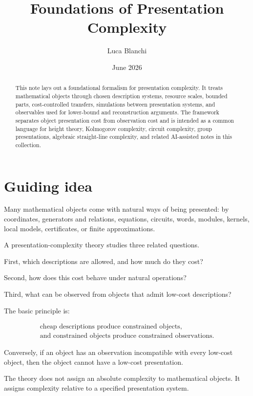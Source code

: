 \documentclass[11pt]{article}
\title{Foundations of Presentation Complexity}
\author{Luca Blanchi}
\date{June 2026}
\begin{document}
\maketitle

\begin{abstract}
This note lays out a foundational formalism for presentation complexity. It treats mathematical objects through chosen description systems, resource scales, bounded parts, cost-controlled transfers, simulations between presentation systems, and observables used for lower-bound and reconstruction arguments. The framework separates object presentation cost from observation cost and is intended as a common language for height theory, Kolmogorov complexity, circuit complexity, group presentations, algebraic straight-line complexity, and related AI-assisted notes in this collection.
\end{abstract}

\section{Guiding idea}

Many mathematical objects come with natural ways of being presented: by coordinates, generators and relations, equations, circuits, words, modules, kernels, local models, certificates, or finite approximations.

A presentation-complexity theory studies three related questions.

First, which descriptions are allowed, and how much do they cost?

Second, how does this cost behave under natural operations?

Third, what can be observed from objects that admit low-cost descriptions?

The basic principle is:

\[
\begin{gathered}
\text{cheap descriptions produce constrained objects,}\\
\text{and constrained objects produce constrained observations.}
\end{gathered}
\]

Conversely, if an object has an observation incompatible with every low-cost object, then the object cannot have a low-cost presentation.

The theory does not assign an absolute complexity to mathematical objects. It assigns complexity relative to a specified presentation system.
\end{document}

